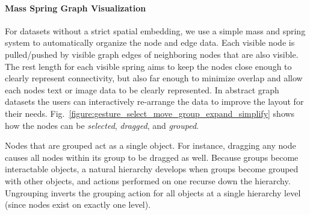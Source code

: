 \documentclass[runningheads,a4paper]{llncs}
\begin{document}
\paragraph{\bf Mass Spring Graph Visualization}
For datasets without a strict spatial embedding, we use a simple mass
and spring system to automatically organize the node and edge data.
Each visible node is pulled/pushed by visible graph edges of
neighboring nodes that are also visible.  The rest length for each
visible spring aims to keep the nodes close enough to clearly
represent connectivity, but also far enough to minimize overlap and
allow each nodes text or image data to be clearly represented.  In
abstract graph datasets the users can interactively re-arrange the
data to improve the layout for their needs.
Fig.~\ref{figure:gesture_select_move_group_expand_simplify} shows how the nodes can be {\em
  selected}, {\em dragged}, and {\em grouped}.  
%

Nodes that are grouped act as a single object. For instance, dragging
any node causes all nodes within its group to be dragged as well.
Because groups become interactable objects, a natural hierarchy develops
when groups become grouped with other objects, and actions performed
on one recurse down the hierarchy.
Ungrouping inverts the grouping action for all
objects at a single hierarchy level (since nodes exist on exactly one level).
\end{document}
